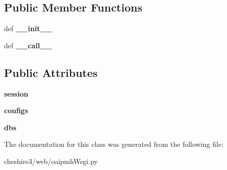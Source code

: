\subsection*{Public Member Functions}
\begin{DoxyCompactItemize}
\item 
\hypertarget{classcheshire3_1_1web_1_1oaipmh_wsgi_1_1_o_a_i_p_m_h_wsgi_application_a5393e28a8b0925bf2c902ec73584e42d}{def {\bfseries \-\_\-\-\_\-init\-\_\-\-\_\-}}\label{classcheshire3_1_1web_1_1oaipmh_wsgi_1_1_o_a_i_p_m_h_wsgi_application_a5393e28a8b0925bf2c902ec73584e42d}

\item 
\hypertarget{classcheshire3_1_1web_1_1oaipmh_wsgi_1_1_o_a_i_p_m_h_wsgi_application_afb72317cedeea02e0849f989bd73d983}{def {\bfseries \-\_\-\-\_\-call\-\_\-\-\_\-}}\label{classcheshire3_1_1web_1_1oaipmh_wsgi_1_1_o_a_i_p_m_h_wsgi_application_afb72317cedeea02e0849f989bd73d983}

\end{DoxyCompactItemize}
\subsection*{Public Attributes}
\begin{DoxyCompactItemize}
\item 
\hypertarget{classcheshire3_1_1web_1_1oaipmh_wsgi_1_1_o_a_i_p_m_h_wsgi_application_a4640ee15d8bd2dcf13a955eb7848cc1d}{{\bfseries session}}\label{classcheshire3_1_1web_1_1oaipmh_wsgi_1_1_o_a_i_p_m_h_wsgi_application_a4640ee15d8bd2dcf13a955eb7848cc1d}

\item 
\hypertarget{classcheshire3_1_1web_1_1oaipmh_wsgi_1_1_o_a_i_p_m_h_wsgi_application_a8b2412684e22f98d65f0ac393fcf53dc}{{\bfseries configs}}\label{classcheshire3_1_1web_1_1oaipmh_wsgi_1_1_o_a_i_p_m_h_wsgi_application_a8b2412684e22f98d65f0ac393fcf53dc}

\item 
\hypertarget{classcheshire3_1_1web_1_1oaipmh_wsgi_1_1_o_a_i_p_m_h_wsgi_application_a23fe595d4ca8c4ec4cdb7950409b67a4}{{\bfseries dbs}}\label{classcheshire3_1_1web_1_1oaipmh_wsgi_1_1_o_a_i_p_m_h_wsgi_application_a23fe595d4ca8c4ec4cdb7950409b67a4}

\end{DoxyCompactItemize}


The documentation for this class was generated from the following file\-:\begin{DoxyCompactItemize}
\item 
cheshire3/web/oaipmh\-Wsgi.\-py\end{DoxyCompactItemize}
